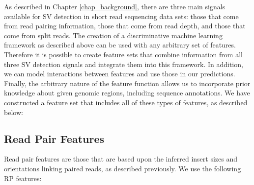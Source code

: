 As described in Chapter \ref{chap_background}, there are three main signals available for SV detection in short read sequencing data sets: those that come from read pairing information, those that come from read depth, and those that come from split reads. The creation of a discriminative machine learning framework as described above can be used with any arbitrary set of features. Therefore it is possible to create feature sets that combine information from all three SV detection signals and integrate them into this framework. In addition, we can model interactions between features and use those in our predictions. Finally, the arbitrary nature of the feature function allows us to incorporate prior knowledge about given genomic regions, including sequence annotations. We have constructed a feature set that includes all of these types of features, as described below:

\subsection{Read Pair Features}

Read pair features are those that are based upon the inferred insert sizes and orientations linking paired reads, as described previously. We use the following RP features:

